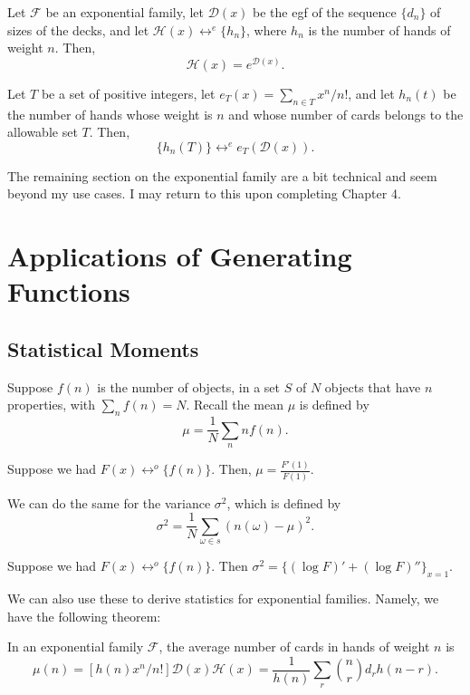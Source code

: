 \documentclass[11pt]{article}
\renewcommand{\>}{\rangle}
\newcommand{\<}{\langle}
\let \mc \mathcal
\begin{document}
\begin{corollary} Let $\mc F$ be an exponential family, let $\mc D(x)$ be the egf of the sequence $\{d_n\}$ of sizes of the decks, and let $\mc H(x) \leftrightarrow^e \{h_n\}$, where $h_n$ is the number of hands of weight $n$.  Then,
$$\mc H(x) = e^{\mc D(x)}.$$
\end{corollary}

\begin{corollary} Let $T$ be a set of positive integers, let $e_T(x) = \sum_{n \in T} x^n/n!$, and let $h_n(t)$ be the number of hands whose weight is $n$ and whose number of cards belongs to the allowable set $T$. Then,
$$\{h_n(T)\} \leftrightarrow^e e_T(\mc D(x)).$$
\end{corollary}

The remaining section on the exponential family are a bit technical and seem beyond my use cases.  I may return to this upon completing Chapter 4.
\pagebreak
\section{Applications of Generating Functions}
\subsection{Statistical Moments}
Suppose $f(n)$ is the number of objects, in a set $S$ of $N$ objects that have $n$ properties, with $\sum_n f(n) = N$.  Recall the mean $\mu$ is defined by 
$$\mu = \frac{1}{N} \sum_n nf(n).$$
\begin{fact}
Suppose we had $F(x) \leftrightarrow^o  \{f(n)\}$.   Then, $\mu = \frac{F'(1)}{F(1)}$.
\end{fact}

We can do the same for the variance $\sigma^2$, which is  defined by 
$$\sigma^2 = \frac{1}{N} \sum_{\omega \in s} (n(\omega) - \mu)^2.$$
\begin{fact}
Suppose we had $F(x) \leftrightarrow^o  \{f(n)\}$.    Then $\sigma^2 = \{ (\log F)' + (\log F)''\}_{x = 1}.$
\end{fact}

We can also use these to derive statistics for exponential families.  Namely, we have the following theorem:
\begin{theorem} In an exponential family $\mc F$, the average number of cards in hands of weight $n$ is 
$$\mu(n) = [h(n)x^n/n!] \mc D(x) \mc H(x) = \frac{1}{h(n)} \sum_{r} \binom{n}{r} d_rh(n-r).$$
\end{theorem}
\end{document}
